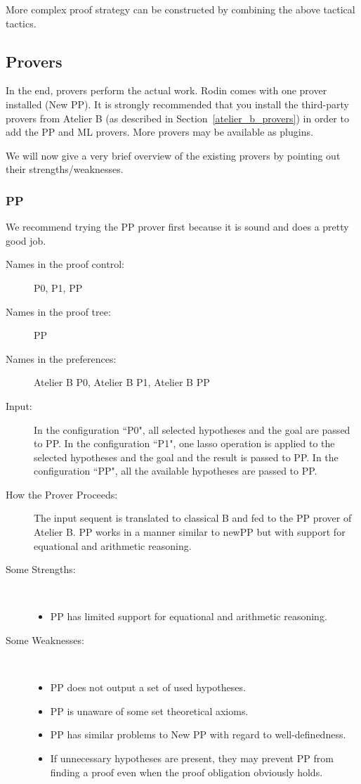 More complex proof strategy can be constructed by combining the above tactical tactics. 

\subsection{Provers}
\label{atelier_b_provers}

In the end, provers perform the actual work.  Rodin comes with one prover installed (New PP).  It is strongly recommended that you install the third-party provers from Atelier B (as described in Section~\ref{atelier_b_provers}) in order to add the PP and ML provers.  More provers may be available as plugins.

We will now give a very brief overview of the existing provers by pointing out their strengths/weaknesses.

\subsubsection{PP}

We recommend trying the PP prover first because it is sound and does a pretty good job.

\begin{description}
	\item[Names in the proof control:]  P0, P1, PP
	\item[Names in the proof tree:] PP
	\item[Names in the preferences:] Atelier B P0, Atelier B P1, Atelier B PP
	\item[Input:] In the configuration ``P0", all selected hypotheses and the goal are passed to PP. In the configuration ``P1", one lasso operation is applied to the selected hypotheses and the goal and the result is passed to PP. In the configuration ``PP", all the available hypotheses are passed to PP.
	\item[How the Prover Proceeds:] The input sequent is translated to classical B and fed to the PP prover of Atelier B. PP works in a manner similar to newPP but with support for equational and arithmetic reasoning.
	\item[Some Strengths:] ~
	\begin{itemize}
		\item PP has limited support for equational and arithmetic reasoning. 
	\end{itemize}
	\item[Some Weaknesses:] ~
\begin{itemize}
	\item PP does not output a set of used hypotheses.
	\item PP is unaware of some set theoretical axioms.
	\item PP has similar problems to New PP with regard to well-definedness.
	\item If unnecessary hypotheses are present, they may prevent PP from finding a proof even when the proof obligation obviously holds. 
\end{itemize}
\end{description}

